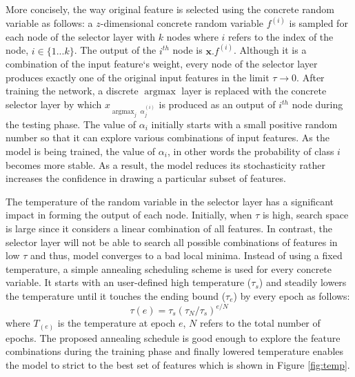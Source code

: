\documentclass{bioinfo}
\DeclareMathOperator*{\argmax}{argmax}
\begin{document}

More concisely, the way original feature is selected using the concrete random variable as follows: a $z$-dimensional concrete random variable $f^{(i)}$ is sampled for each node of the selector layer with $k$ nodes where $i$ refers to the index of the node, $i \in \{1...k\}$. The output of the $i^{th}$ node is $ \textbf{x}.f^{(i)}$. Although it is a combination of the input feature`s weight, every node of the selector layer produces exactly one of the original input features in the limit $\tau \to 0$. After training the network, a discrete $\argmax$ layer is replaced with the concrete selector layer by which $x_{\argmax_j \; \alpha_j^{(i)}}$ is produced as an output of $i^{th}$ node during the testing phase. The value of $\alpha_i$ initially starts with a small positive random number so that it can explore various combinations of input features. As the model is being trained, the value of $\alpha_i$, in other words the probability of class $i$ becomes more stable. As a result, the model reduces its stochasticity rather increases the confidence in drawing a particular subset of features. 

The temperature of the random variable in the selector layer has a significant impact in forming the output of each node. Initially, when $\tau$ is high, search space is large since it considers a linear combination of all features. In contrast, the selector layer will not be able to search all possible combinations of features in low $\tau$ and thus, model converges to a bad local minima. Instead of using a fixed temperature, a simple annealing scheduling scheme is used for every concrete variable. It starts with an user-defined high temperature ($\tau_s$) and steadily lowers the temperature until it touches the ending bound ($\tau_e$) by every epoch as follows: 
\begin{equation}
\tau(e) = \tau_s(\tau_N/\tau_s)^{e/N}
\end{equation}
where $T_{(e)}$ is the temperature at epoch $e$, $N$ refers to the total number of epochs. The proposed annealing schedule is good enough to explore the feature combinations during the training phase and finally lowered temperature enables the model to strict to the best set of features which is shown in Figure \ref{fig:temp}.
\end{document}
